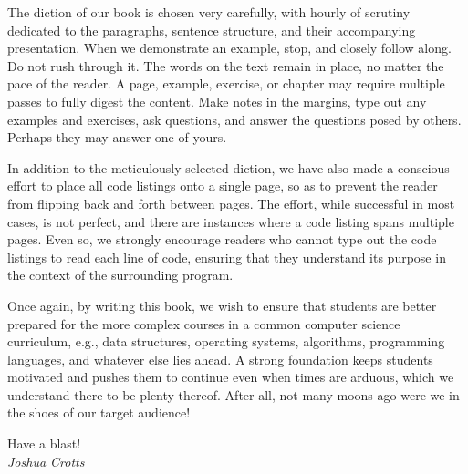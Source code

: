 The diction of our book is chosen very carefully, with hourly of scrutiny dedicated to the paragraphs, sentence structure, and their accompanying presentation.
When we demonstrate an example, stop, and closely follow along.
Do not rush through it.
The words on the text remain in place, no matter the pace of the reader.
A page, example, exercise, or chapter may require multiple passes to fully digest the content.
Make notes in the margins, type out any examples and exercises, ask questions, and answer the questions posed by others.
Perhaps they may answer one of yours.

In addition to the meticulously-selected diction, we have also made a conscious effort to place all code listings onto a single page, so as to prevent the reader from flipping back and forth between pages. The effort, while successful in most cases, is not perfect, and there are instances where a code listing spans multiple pages. Even so, we strongly encourage readers who cannot type out the code listings to read each line of code, ensuring that they understand its purpose in the context of the surrounding program.

Once again, by writing this book, we wish to ensure that students are better prepared for the more complex courses in a common computer science curriculum, e.g., data structures, operating systems, algorithms, programming languages, and whatever else lies ahead. 
A strong foundation keeps students motivated and pushes them to continue even when times are arduous, which we understand there to be plenty thereof.
After all, not many moons ago were we in the shoes of our target audience!

\begin{flushright}
Have a blast!\\\emph{Joshua Crotts}
\end{flushright}